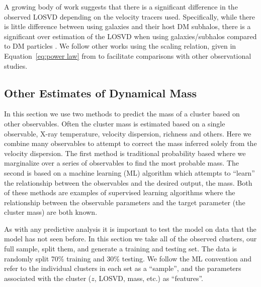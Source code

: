 \documentclass[fleqn,usenatbib]{mnras}
\newcommand{\editorial}[1]{\textcolor{red}{#1}}
\begin{document}
A growing body of work suggests that there is a significant difference in the observed LOSVD depending on the velocity tracers used. Specifically, while there is little difference between using galaxies and their host DM subhalos, there is a significant over estimation of the LOSVD when using galaxies/subhalos compared to DM particles \citep{Munari2013}. We follow other works  using the scaling relation, given in Equation~\ref{eq:power law} from \cite{Munari2013} to facilitate comparisons with other observational studies. 

\subsection{Other Estimates of Dynamical Mass}
In this section we use two methods to predict the mass of a cluster based on other observables. Often the cluster mass is estimated based on a single observable, X-ray temperature, velocity dispersion, richness and others. Here we combine many observables to attempt to correct the mass inferred solely from the velocity dispersion. The first method is traditional probability based where we marginalize over a series of observables to find the most probable mass. The second is based on a machine learning (ML) algorithm which attempts to ``learn'' the relationship between the observables and the desired output, the mass. Both of these methods are examples of supervised learning algorithms where the relationship between the observable parameters and the target parameter (the cluster mass) are both known.

As with any predictive analysis it is important to test the model on data that the model has not seen before. In this section we take all of the observed clusters, our full sample, split them, and generate a training and testing set. The data is randomly split 70\% training and 30\% testing. We follow the ML convention and refer to the individual clusters in each set as a ``sample'', and the parameters associated with the cluster ($z$, LOSVD, mass, etc.) as ``features''.
\end{document}
